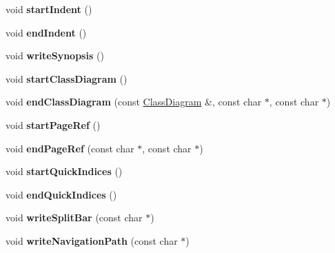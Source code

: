 \begin{DoxyCompactItemize}
\item 
\mbox{\label{class_man_generator_a02774d23b0846b52af4c0b76e0db6c0f}} 
void {\bfseries start\+Indent} ()
\item 
\mbox{\label{class_man_generator_a1d28184243c9614854f089a76a340f23}} 
void {\bfseries end\+Indent} ()
\item 
\mbox{\label{class_man_generator_aec39420ccf2c964a39c97e79e1d2cbc0}} 
void {\bfseries write\+Synopsis} ()
\item 
\mbox{\label{class_man_generator_a68a8a44e48aa4441ed8f522f4f88dc75}} 
void {\bfseries start\+Class\+Diagram} ()
\item 
\mbox{\label{class_man_generator_ac37a68b10d76cc5d8a1125e5060b5211}} 
void {\bfseries end\+Class\+Diagram} (const \mbox{\hyperlink{class_class_diagram}{Class\+Diagram}} \&, const char $\ast$, const char $\ast$)
\item 
\mbox{\label{class_man_generator_a15352d2d3122b7b9d24e9ea564026d9f}} 
void {\bfseries start\+Page\+Ref} ()
\item 
\mbox{\label{class_man_generator_aedfd0c9012aa4bab7db46b5388552342}} 
void {\bfseries end\+Page\+Ref} (const char $\ast$, const char $\ast$)
\item 
\mbox{\label{class_man_generator_a955d39d6b1272951e9c3696e55a7e97f}} 
void {\bfseries start\+Quick\+Indices} ()
\item 
\mbox{\label{class_man_generator_a61560f36bab8608c98e9cf89fd5371bb}} 
void {\bfseries end\+Quick\+Indices} ()
\item 
\mbox{\label{class_man_generator_a07aea6047475012679e979aca5d23038}} 
void {\bfseries write\+Split\+Bar} (const char $\ast$)
\item 
\mbox{\label{class_man_generator_a51eac301eeb71972b89a4ac6be9fd6b5}} 
void {\bfseries write\+Navigation\+Path} (const char $\ast$)

\end{DoxyCompactItemize}
